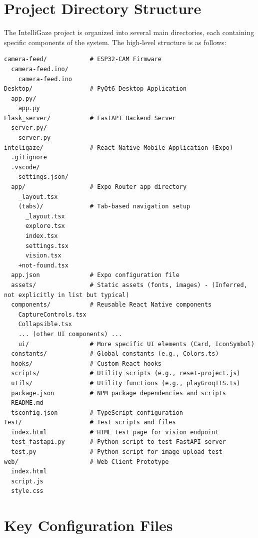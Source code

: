 \documentclass[12pt, a4paper]{report}
\begin{document}
\cleardoublepage %
\appendix
\chapter{Project Directory Structure}
\label{app:directory_structure}

The IntelliGaze project is organized into several main directories, each containing specific components of the system. The high-level structure is as follows:

\begin{verbatim}
camera-feed/            # ESP32-CAM Firmware
  camera-feed.ino/
    camera-feed.ino
Desktop/                # PyQt6 Desktop Application
  app.py/
    app.py
Flask_server/           # FastAPI Backend Server
  server.py/
    server.py
inteligaze/             # React Native Mobile Application (Expo)
  .gitignore
  .vscode/
    settings.json/
  app/                  # Expo Router app directory
    _layout.tsx
    (tabs)/             # Tab-based navigation setup
      _layout.tsx
      explore.tsx
      index.tsx
      settings.tsx
      vision.tsx
    +not-found.tsx
  app.json              # Expo configuration file
  assets/               # Static assets (fonts, images) - (Inferred, not explicitly in list but typical)
  components/           # Reusable React Native components
    CaptureControls.tsx
    Collapsible.tsx
    ... (other UI components) ...
    ui/                 # More specific UI elements (Card, IconSymbol)
  constants/            # Global constants (e.g., Colors.ts)
  hooks/                # Custom React hooks
  scripts/              # Utility scripts (e.g., reset-project.js)
  utils/                # Utility functions (e.g., playGroqTTS.ts)
  package.json          # NPM package dependencies and scripts
  README.md
  tsconfig.json         # TypeScript configuration
Test/                   # Test scripts and files
  index.html            # HTML test page for vision endpoint
  test_fastapi.py       # Python script to test FastAPI server
  test.py               # Python script for image upload test
web/                    # Web Client Prototype
  index.html
  script.js
  style.css
\end{verbatim}

\chapter{Key Configuration Files}
\label{app:config_files}
\end{document}
